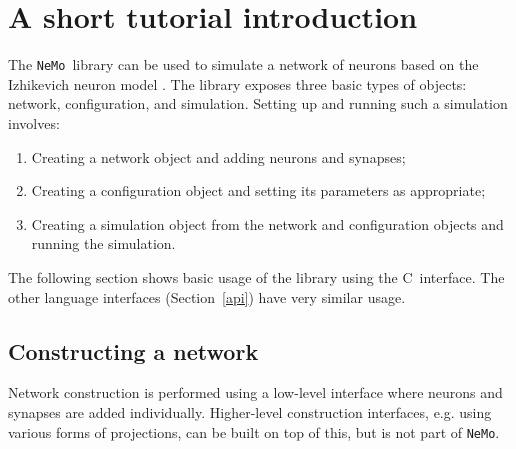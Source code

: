 \documentclass[a4paper]{article}
\newcommand{\nemo}{\texttt{NeMo}}
\newcommand{\cpp}{C\nolinebreak\hspace{-.05em}\raisebox{.4ex}{\tiny\bf +}\nolinebreak\hspace{-.10em}\raisebox{.4ex}{\tiny\bf +}}
\begin{document}
\maketitle

\begin{abstract}

\nemo\ is a library for discrete-time simulation of spiking neural networks. 
It is aimed at real-time simulation of tens of thousands of neurons on a single workstation.
\nemo\ runs on parallel hardware;
	In particular it can run on CUDA-enabled GPUs.
No parallel programming is required, however, on the part of the end user,
	as parallelisation is handled by the library.
The library has interfaces in \cpp, C, Python, and Matlab.

\end{abstract}



\section{A short tutorial introduction}

The \nemo\ library can be used to simulate a network of neurons based on the
	Izhikevich neuron model \cite{izhikevich2003simple_model}.
The library exposes three basic types of objects:
	network, configuration, and simulation.
Setting up and running such a simulation involves:

\begin{enumerate}
	\item Creating a network object and adding neurons and synapses;
	\item Creating a configuration object and setting its parameters as appropriate;
	\item Creating a simulation object from the network and configuration objects and running the simulation.
\end{enumerate}

The following section shows basic usage of the library using the \cpp\ interface.
The other language interfaces (Section~\ref{api}) have very similar usage.

\subsection{Constructing a network}

Network construction is performed using a low-level interface
	where neurons and synapses are added individually.
Higher-level construction interfaces,
	e.g. using various forms of projections,
	can be built on top of this,
	but is not part of \nemo.
\end{document}
